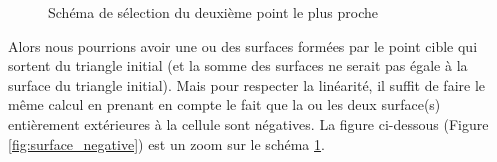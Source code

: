 \begin{figure}[H]
    \centering
    \caption{Schéma de sélection du deuxième point le plus proche}
    \label{fig:deux_pt}
\end{figure}


Alors nous pourrions avoir une ou des surfaces formées par le point cible qui sortent du triangle initial (et la somme des surfaces ne serait pas égale à la surface du triangle initial). Mais pour respecter la linéarité, il suffit de faire le même calcul en prenant en compte le fait que la ou les deux surface(s) entièrement extérieures à la cellule sont négatives. La figure ci-dessous (Figure \ref{fig:surface_negative}) est un zoom sur le schéma \ref{fig:deux_pt}.

